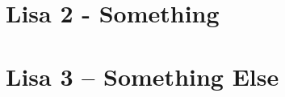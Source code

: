 
\clearpage
{}
{}\label{chapter:appendix-something}
\chapter*{Lisa 2 - Something}


\clearpage
{}
{}\label{chapter:appendix-something-else}
\chapter*{Lisa 3 -- Something Else}

